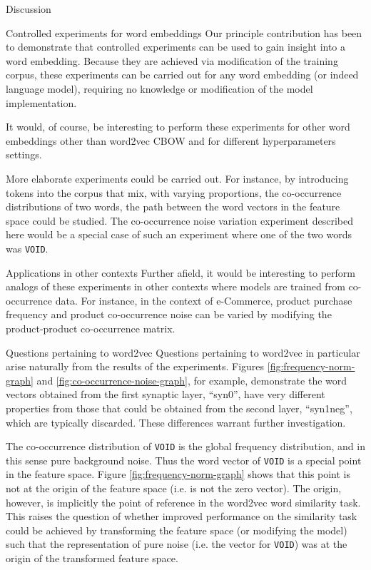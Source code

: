 \documentclass{article} %
\newcommand{\word}[1]{\texttt{#1}}
\begin{document}
\begin{section}{Discussion}\label{future-directions}

\begin{subsection}{Controlled experiments for word embeddings}
Our principle contribution has been to demonstrate that controlled experiments can be used to gain insight into a word embedding.
Because they are achieved via modification of the training corpus, these experiments can be carried out for any word embedding (or indeed language model), requiring no knowledge or modification of the model implementation.

It would, of course, be interesting to perform these experiments for other word embeddings other than word2vec CBOW and for different hyperparameters settings.

More elaborate experiments could be carried out.
For instance, by introducing tokens into the corpus that mix, with varying proportions, the co-occurrence distributions of two words, the path between the word vectors in the feature space could be studied.
The co-occurrence noise variation experiment described here would be a special case of such an experiment where one of the two words was \word{VOID}.
\end{subsection}

\begin{subsection}{Applications in other contexts}
Further afield, it would be interesting to perform analogs of these experiments in other contexts where models are trained from co-occurrence data.
For instance, in the context of e-Commerce, product purchase frequency and product co-occurrence noise can be varied by modifying the product-product co-occurrence matrix.
\end{subsection}

\begin{subsection}{Questions pertaining to word2vec}
Questions pertaining to word2vec in particular arise naturally from the results of the experiments.
Figures \ref{fig:frequency-norm-graph} and \ref{fig:co-occurrence-noise-graph}, for example, demonstrate the word vectors obtained from the first synaptic layer, ``syn0'', have very different properties from those that could be obtained from the second layer, ``syn1neg'', which are typically discarded.
These differences warrant further investigation.

The co-occurrence distribution of \word{VOID} is the global frequency distribution, and in this sense pure background noise.
Thus the word vector of \word{VOID} is a special point in the feature space.
Figure \ref{fig:frequency-norm-graph} shows that this point is not at the origin of the feature space (i.e. is not the zero vector).
The origin, however, is implicitly the point of reference in the word2vec word similarity task.
This raises the question of whether improved performance on the similarity task could be achieved by transforming the feature space (or modifying the model) such that the representation of pure noise (i.e. the vector for \word{VOID}) was at the origin of the transformed feature space. 
\end{subsection}

\end{section}

\clearpage
\footnotesize


\end{document}
